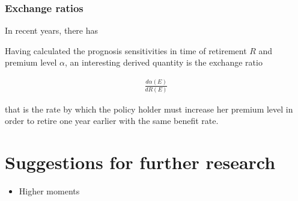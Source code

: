 \documentclass{article}
\newcommand{\1}[1]{\mathbbm{1}_{\left\lbrace #1 \right\rbrace}}
\theoremstyle{break}
\theoremstyle{remark}
\numberwithin{equation}{section}
\begin{document}
\subsubsection{Exchange ratios}

In recent years, there has

Having calculated the prognosis sensitivities in time of retirement $R$ and premium level $\alpha$, an interesting derived quantity is the exchange ratio

\begin{align*}
	\frac{d \alpha (E)}{d R (E)}
\end{align*}

that is the rate by which the policy holder must increase her premium level in order to retire one year earlier with the same benefit rate. 

\newpage
\section{Suggestions for further research}

\begin{itemize}
	\item Higher moments
\end{itemize}

\newpage




\newpage
\end{document}
